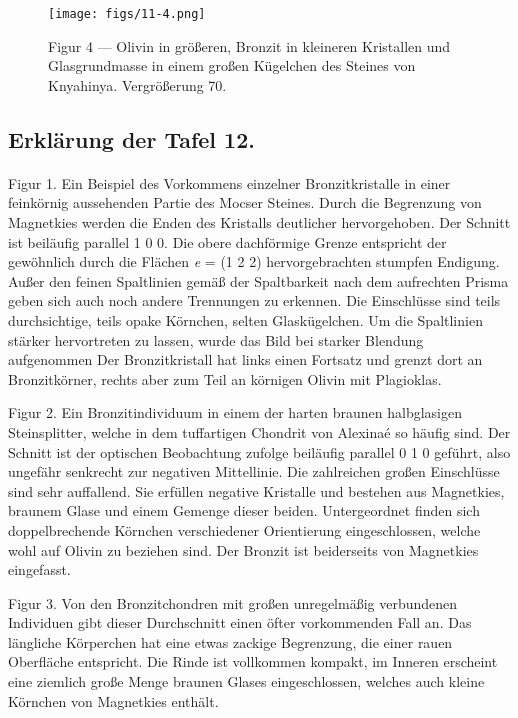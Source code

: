 \documentclass[a4paper, 12pt, oneside]{article}
\begin{document}
\vspace*{\fill}
\begin{figure}[H]
\centering
\texttt{[image: figs/11-4.png]}
\caption{\small Figur 4 --- Olivin in größeren, Bronzit in kleineren Kristallen und Glasgrundmasse in einem großen Kügelchen des Steines von Knyahinya. Vergrößerung 70.}
\end{figure}
\vspace*{\fill}
\clearpage

\subsection{Erklärung der Tafel 12.}
\paragraph{}
Figur 1. Ein Beispiel des Vorkommens einzelner Bronzitkristalle in einer feinkörnig aussehenden Partie des Mocser Steines. Durch die Begrenzung von Magnetkies werden die Enden des Kristalls deutlicher hervorgehoben. Der Schnitt ist beiläufig parallel 1 0 0. Die obere dachförmige Grenze entspricht der gewöhnlich durch die Flächen \emph{e} = (1 2 2) hervorgebrachten stumpfen Endigung. Außer den feinen Spaltlinien gemäß der Spaltbarkeit nach dem aufrechten Prisma geben sich auch noch andere Trennungen zu erkennen. Die Einschlüsse sind teils durchsichtige, teils opake Körnchen, selten Glaskügelchen. Um die Spaltlinien stärker hervortreten zu lassen, wurde das Bild bei starker Blendung aufgenommen Der Bronzitkristall hat links einen Fortsatz und grenzt dort an Bronzitkörner, rechts aber zum Teil an körnigen Olivin mit Plagioklas.

Figur 2. Ein Bronzitindividuum in einem der harten braunen halbglasigen Steinsplitter, welche in dem tuffartigen Chondrit von Alexinaé so häufig sind. Der Schnitt ist der optischen Beobachtung zufolge beiläufig parallel 0 1 0 geführt, also ungefähr senkrecht zur negativen Mittellinie. Die zahlreichen großen Einschlüsse sind sehr auffallend. Sie erfüllen negative Kristalle und bestehen aus Magnetkies, braunem Glase und einem Gemenge dieser beiden. Untergeordnet finden sich doppelbrechende Körnchen verschiedener Orientierung eingeschlossen, welche wohl auf Olivin zu beziehen sind. Der Bronzit ist beiderseits von Magnetkies eingefasst.

Figur 3. Von den Bronzitchondren mit großen unregelmäßig verbundenen Individuen gibt dieser Durchschnitt einen öfter vorkommenden Fall an. Das längliche Körperchen hat eine etwas zackige Begrenzung, die einer rauen Oberfläche entspricht. Die Rinde ist vollkommen kompakt, im Inneren erscheint eine ziemlich große Menge braunen Glases eingeschlossen, welches auch kleine Körnchen von Magnetkies enthält.
\end{document}
